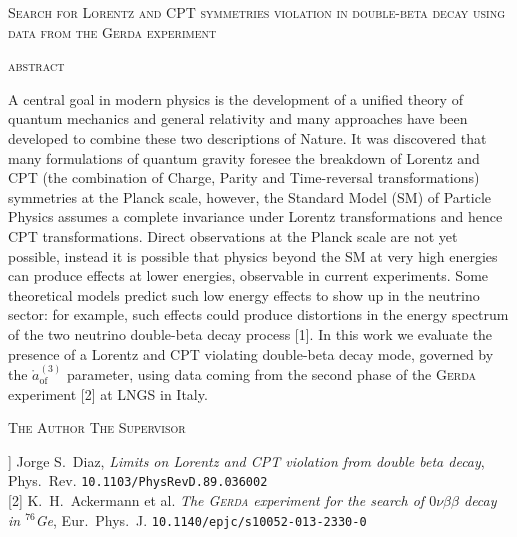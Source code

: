 \documentclass[11pt, oneside]{article}
\newcommand{\aof}{\mathring{a}_\text{of}^{(3)}}
\begin{document}
\begin{center}
	\Large{\textsc{Search for Lorentz and CPT symmetries violation in double-beta decay using data from the \textsc{Gerda} experiment}} \\
	\vspace{1cm}
	\vspace{1cm}
\end{center}
\centerline{\textsc{abstract}}\vspace{11pt}
A central goal in modern physics is the development of a unified theory of quantum mechanics and general relativity and many approaches have been developed to combine these two descriptions of Nature. It was discovered that many formulations of quantum gravity foresee the breakdown of Lorentz and CPT (the combination of Charge, Parity and Time-reversal transformations) symmetries at the Planck scale, however, the Standard Model (SM) of Particle Physics assumes a complete invariance under Lorentz transformations and hence CPT transformations. Direct observations at the Planck scale are not yet possible, instead it is possible that physics beyond the SM at very high energies can produce effects at lower energies, observable in current experiments. Some theoretical models predict such low energy effects to show up in the neutrino sector: for example, such effects could produce distortions in the energy spectrum of the two neutrino double-beta decay process [1]. In this work we evaluate the presence of a Lorentz and CPT violating double-beta decay mode, governed by the $\aof$ parameter, using data coming from the second phase of the \textsc{Gerda} experiment [2] at LNGS in Italy.

\vspace{1cm}
\begin{multicols}{2}
\noindent
\textsc{The Author}
\columnbreak
\flushright
\textsc{The Supervisor}
\end{multicols}
\vspace*{\fill}
\footnotesize
\noindent {[1}] Jorge S.~Diaz, \textsl{Limits on Lorentz and CPT violation from double beta decay}, Phys.~Rev. \texttt{10.1103/PhysRevD.89.036002}\\
{[2]} K.~H.~Ackermann et al. \textsl{The \textsc{Gerda} experiment for the search of $0\nu\beta\beta$ decay in $^{76}$Ge}, Eur.~Phys.~J. \texttt{10.1140/epjc/s10052-013-2330-0}
\end{document}
